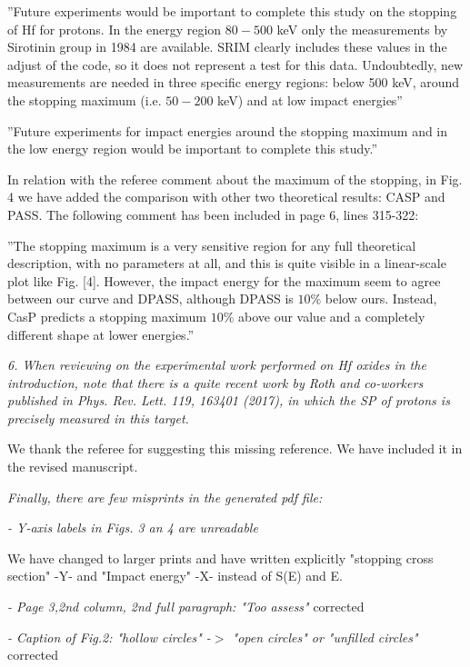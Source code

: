\documentclass[a4paper,10pt]{article}
\begin{document}
{\small ''Future experiments  would be important to
complete this study on the stopping of Hf for protons. In the energy region $80-500$ keV only the measurements by Sirotinin group in 1984 are available. SRIM clearly includes these values in the adjust of the code, so it does not represent a test for this data. Undoubtedly, new measurements are needed in three specific energy regions: below 500 keV, around the stopping maximum (i.e. $50-200$ keV) and at low impact energies''} 

{\small ''Future experiments for impact energies around the stopping maximum and in the low energy region would be important to complete this study.''}


{\color{red} In relation with the referee comment about the maximum of the stopping, in Fig. 4 we have added the comparison with other two theoretical results: CASP and PASS. The following comment has been included in page 6, lines 315-322:}

{\small ''The stopping maximum is a very sensitive region for any full theoretical description, with no parameters at all, and this is quite visible in a linear-scale plot like Fig. [4]. However, the impact energy for the maximum seem to agree between our curve and DPASS, although DPASS is $10 \%$ below ours. Instead, CasP predicts a stopping maximum $10 \%$ above our value and a completely different shape at lower energies.''}


\vspace{0.25cm}
\textsl{
6. When reviewing on the experimental work performed on Hf oxides in
the introduction, note that there is a quite recent work by Roth and
co-workers published in Phys. Rev. Lett. 119, 163401 (2017), in which
the SP of protons is precisely measured in this target.}

\vspace{0.1cm}
{\color{red} We thank the referee for suggesting this missing reference. We have
included it in the revised manuscript.}

\vspace{0.25cm}
\textsl{Finally, there are few misprints in the generated pdf file:}

\textsl{- Y-axis labels in Figs. 3 an 4 are unreadable }

{\color{red} We have changed to larger prints  and have written explicitly "stopping cross section" -Y- and "Impact energy" -X- instead of S(E) and E. }

\textsl{- Page 3,2nd column, 2nd full paragraph: "Too assess"}
{\color{red} corrected}

\textsl{- Caption of Fig.2: "hollow circles" -$>$ "open circles" or
"unfilled circles"}
{\color{red} corrected}
\end{document}
